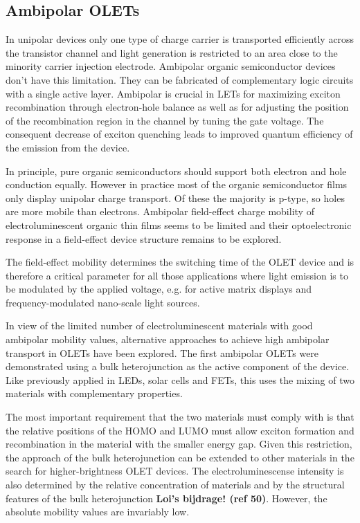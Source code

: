 \subsection{Ambipolar OLETs} %
In unipolar devices only one type of charge carrier is transported efficiently across the transistor channel and light generation is restricted to an area close to the minority carrier injection electrode. Ambipolar organic semiconductor devices don't have this limitation. They can be fabricated of complementary logic circuits with a single active layer. Ambipolar is crucial in LETs for maximizing exciton recombination through electron-hole balance as well as for adjusting the position of the recombination region in the channel by tuning the gate voltage. The consequent decrease of exciton quenching leads to improved quantum efficiency of the emission from the device.

In principle, pure organic semiconductors should support both electron and hole conduction equally. However in practice most of the organic semiconductor films only display unipolar charge transport. Of these the majority is p-type, so holes are more mobile than electrons. Ambipolar field-effect charge mobility of electroluminescent organic thin films seems to be limited and their optoelectronic response in a field-effect device structure remains to be explored.

The field-effect mobility determines the switching time of the OLET device and is therefore a critical parameter for all those applications where light emission is to be modulated by the applied voltage, e.g. for active matrix displays and frequency-modulated nano-scale light sources. 

In view of the limited number of electroluminescent materials with good ambipolar mobility values, alternative approaches to achieve high ambipolar transport in OLETs have been explored. The first ambipolar OLETs were demonstrated using a bulk heterojunction as the active component of the device. Like previously applied in LEDs, solar cells and FETs, this uses the mixing of two materials with complementary properties.

The most important requirement that the two materials must comply with is that the relative positions of the HOMO and LUMO must allow exciton formation and recombination in the material with the smaller energy gap. Given this restriction, the approach of the bulk heterojunction can be extended to other materials in the search for higher-brightness OLET devices. The electroluminescense intensity is also determined by the relative concentration of materials and by the structural features of the bulk heterojunction \textbf{Loi’s bijdrage! (ref 50)}. However, the absolute mobility values are invariably low.

